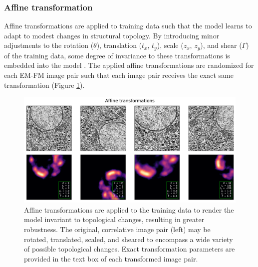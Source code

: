 \subsubsection{Affine transformation}
Affine transformations are applied to training data such that the model learns to adapt to modest changes in structural topology. By introducing minor adjustments to the rotation ($\theta$), translation ($t_x$, $t_y$), scale ($z_x$, $z_y$), and shear ($\Gamma$) of the training data, some degree of invariance to these transformations is embedded into the model \cite{simard2003best}. The applied affine transformations are randomized for each EM-FM image pair such that each image pair receives the exact same transformation (Figure \ref{fig:4M_affine}).

\begin{figure}[!tbh]
    \centering
    \includegraphics[width=\linewidth]{chapter-4/figures_PDF/fig4-M2_affine.pdf}
    \caption{Affine transformations are applied to the training data to render the model invariant to topological changes, resulting in greater robustness.
    The original, correlative image pair (left) may be rotated, translated, scaled, and sheared to encompass a wide variety of possible topological changes. Exact transformation parameters are provided in the text box of each transformed image pair.}
    \label{fig:4M_affine}
\end{figure}


